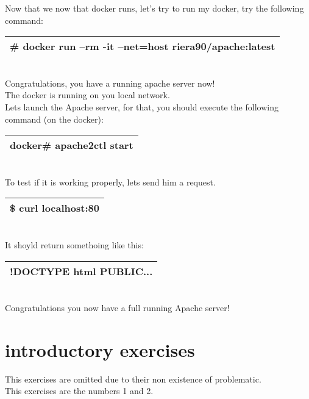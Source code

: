 \documentclass[a4paper,10pt]{article}
\begin{document}
Now that we now that docker runs, let's try to run my docker, try the following command:
\vspace{0.5cm}\\\begin{tabular}{|l|}\hline
\# docker run --rm -it --net=host riera90/apache:latest
\\\hline\end{tabular}\vspace{0.5cm}\\
Congratulations, you have a running apache server now!\\
The docker is running on you local network.\vspace{0.5cm}\\
Lets launch the Apache server, for that, you should execute the following command (on the docker):
\vspace{0.5cm}\\\begin{tabular}{|l|}\hline
docker\# apache2ctl start
\\\hline\end{tabular}\vspace{0.5cm}\\
To test if it is working properly, lets send him a request.
\vspace{0.5cm}\\\begin{tabular}{|l|}\hline
\$ curl localhost:80
\\\hline\end{tabular}\vspace{0.5cm}\\
It shoyld return somethoing like this:
\vspace{0.5cm}\\\begin{tabular}{|l|}\hline
!DOCTYPE html PUBLIC...
\\\hline\end{tabular}\vspace{0.5cm}\\
Congratulations you now have a full running Apache server!
\section{introductory exercises}
This exercises are omitted due to their non existence of problematic.\\
This exercises are the numbers 1 and 2.
\end{document}
